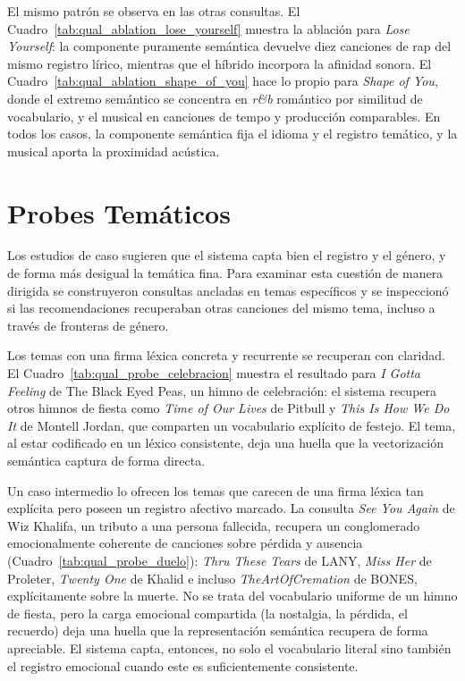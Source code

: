 El mismo patrón se observa en las otras consultas. El Cuadro~\ref{tab:qual_ablation_lose_yourself} muestra la ablación para \emph{Lose Yourself}: la componente puramente semántica devuelve diez canciones de rap del mismo registro lírico, mientras que el híbrido incorpora la afinidad sonora. El Cuadro~\ref{tab:qual_ablation_shape_of_you} hace lo propio para \emph{Shape of You}, donde el extremo semántico se concentra en \textit{r\&b} romántico por similitud de vocabulario, y el musical en canciones de tempo y producción comparables. En todos los casos, la componente semántica fija el idioma y el registro temático, y la musical aporta la proximidad acústica.





\FloatBarrier
\section{Probes Temáticos}
\label{sec:probes-tematicos}

Los estudios de caso sugieren que el sistema capta bien el registro y el género, y de forma más desigual la temática fina. Para examinar esta cuestión de manera dirigida se construyeron consultas ancladas en temas específicos y se inspeccionó si las recomendaciones recuperaban otras canciones del mismo tema, incluso a través de fronteras de género.

Los temas con una firma léxica concreta y recurrente se recuperan con claridad. El Cuadro~\ref{tab:qual_probe_celebracion} muestra el resultado para \emph{I Gotta Feeling} de The Black Eyed Peas, un himno de celebración: el sistema recupera otros himnos de fiesta como \emph{Time of Our Lives} de Pitbull y \emph{This Is How We Do It} de Montell Jordan, que comparten un vocabulario explícito de festejo. El tema, al estar codificado en un léxico consistente, deja una huella que la vectorización semántica captura de forma directa.



Un caso intermedio lo ofrecen los temas que carecen de una firma léxica tan explícita pero poseen un registro afectivo marcado. La consulta \emph{See You Again} de Wiz Khalifa, un tributo a una persona fallecida, recupera un conglomerado emocionalmente coherente de canciones sobre pérdida y ausencia (Cuadro~\ref{tab:qual_probe_duelo}): \emph{Thru These Tears} de LANY, \emph{Miss Her} de Proleter, \emph{Twenty One} de Khalid e incluso \emph{TheArtOfCremation} de BONES, explícitamente sobre la muerte. No se trata del vocabulario uniforme de un himno de fiesta, pero la carga emocional compartida (la nostalgia, la pérdida, el recuerdo) deja una huella que la representación semántica recupera de forma apreciable. El sistema capta, entonces, no solo el vocabulario literal sino también el registro emocional cuando este es suficientemente consistente.

